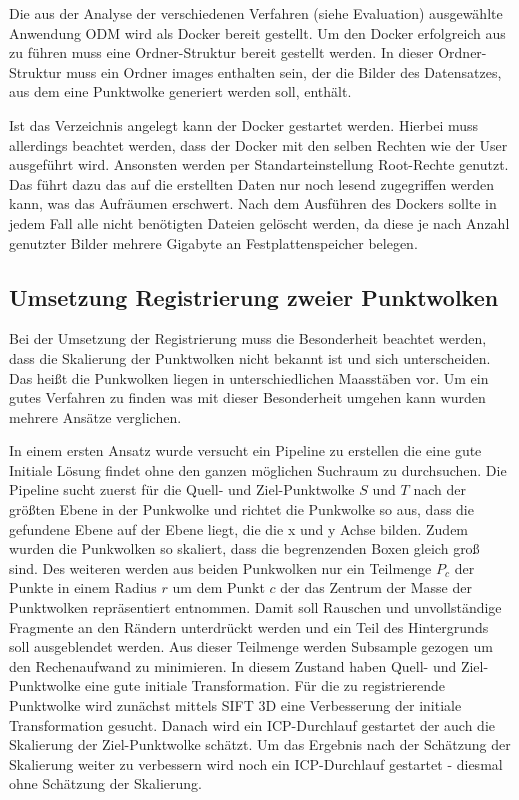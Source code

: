 \documentclass[12pt,titlepage, twoside]{article}
\begin{document}
Die aus der Analyse der verschiedenen Verfahren (siehe Evaluation) ausgewählte Anwendung ODM wird als Docker bereit gestellt. Um den Docker erfolgreich aus zu führen muss eine Ordner-Struktur bereit gestellt werden.
In dieser Ordner-Struktur muss ein Ordner \glqq images\grqq{} enthalten sein, der die Bilder des Datensatzes, aus dem eine Punktwolke generiert werden soll, enthält.

Ist das Verzeichnis angelegt kann der Docker gestartet werden. Hierbei muss allerdings beachtet werden, dass der Docker mit den selben Rechten wie der User ausgeführt wird. Ansonsten werden per Standarteinstellung Root-Rechte genutzt.
Das führt dazu das auf die erstellten Daten nur noch lesend zugegriffen werden kann, was das Aufräumen erschwert.
Nach dem Ausführen des Dockers sollte in jedem Fall alle nicht benötigten Dateien gelöscht werden, da diese je nach Anzahl genutzter Bilder mehrere Gigabyte an Festplattenspeicher belegen.

\subsection{Umsetzung Registrierung zweier Punktwolken}
\label{sec:realisierung:implementierung2}

Bei der Umsetzung der Registrierung muss die Besonderheit beachtet werden, dass die Skalierung der Punktwolken nicht bekannt ist und sich unterscheiden. Das heißt die Punkwolken liegen in unterschiedlichen Maasstäben vor.  
Um ein gutes Verfahren zu finden was mit dieser Besonderheit umgehen kann wurden mehrere Ansätze verglichen.

In einem ersten Ansatz wurde versucht ein Pipeline zu erstellen die eine gute Initiale Lösung findet ohne den ganzen möglichen Suchraum zu durchsuchen.
Die Pipeline sucht zuerst für die Quell- und Ziel-Punktwolke $S$ und $T$ nach der größten Ebene in der Punkwolke und richtet die Punkwolke so aus, dass die gefundene Ebene auf der Ebene liegt, die die x und y Achse bilden.
Zudem wurden die Punkwolken so skaliert, dass die begrenzenden Boxen gleich groß sind.
Des weiteren werden aus beiden Punkwolken nur ein Teilmenge $P_c$ der Punkte in einem Radius $r$ um dem Punkt $c$ der das Zentrum der Masse der Punktwolken repräsentiert entnommen.
Damit soll Rauschen und unvollständige Fragmente an den Rändern unterdrückt werden und ein Teil des Hintergrunds soll ausgeblendet werden.
Aus dieser Teilmenge werden Subsample gezogen um den Rechenaufwand zu minimieren. In diesem Zustand haben Quell- und Ziel-Punktwolke eine gute initiale Transformation.
Für die zu registrierende Punktwolke wird zunächst mittels SIFT 3D \cite{Sift3D} eine Verbesserung der initiale Transformation gesucht. Danach wird ein ICP-Durchlauf gestartet der auch die Skalierung der Ziel-Punktwolke schätzt.
Um das Ergebnis nach der Schätzung der Skalierung weiter zu verbessern wird noch ein ICP-Durchlauf gestartet - diesmal ohne Schätzung der Skalierung.
\end{document}
